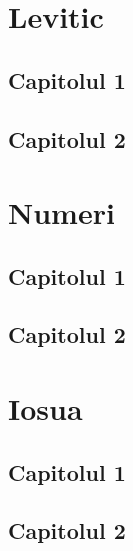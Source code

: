 \documentclass[12pt,a4paper]{article}
\begin{document}

\section{Levitic}

\subsection{Capitolul 1}

\subsection{Capitolul 2}


\section{Numeri}

\subsection{Capitolul 1}

\subsection{Capitolul 2}


\section{Iosua}

\subsection{Capitolul 1}

\subsection{Capitolul 2}

\end{document}
